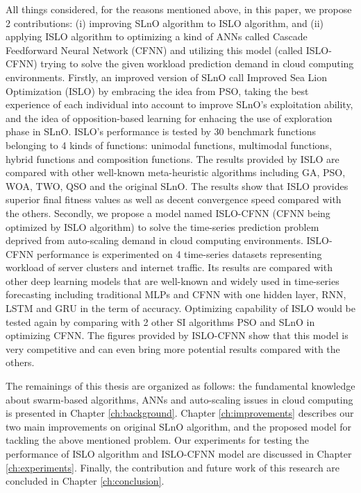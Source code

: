 \documentclass[../main.tex]{subfiles}
\begin{document}
	All things considered, for the reasons mentioned above, in this paper, we propose 2 contributions: (i) improving SLnO algorithm to ISLO algorithm, and (ii) applying ISLO algorithm to optimizing a kind of ANNs called Cascade Feedforward Neural Network (CFNN) and utilizing this model (called ISLO-CFNN) trying to solve the given workload prediction demand in cloud computing environments. Firstly, an improved version of SLnO call Improved Sea Lion Optimization (ISLO) by embracing the idea from PSO, taking the best experience of each individual into account to improve SLnO's exploitation ability, and the idea of opposition-based learning for enhacing the use of exploration phase in SLnO. ISLO's performance is tested by 30 benchmark functions belonging to 4 kinds of functions: unimodal functions, multimodal functions, hybrid functions and composition functions. The results provided by ISLO are compared with other well-known meta-heuristic algorithms including GA, PSO, WOA, TWO, QSO and the original SLnO. The results show that ISLO provides superior final fitness values as well as decent convergence speed compared with the others. Secondly, we propose a model named ISLO-CFNN (CFNN being optimized by ISLO algorithm) to solve the time-series prediction problem deprived from  auto-scaling demand in cloud computing environments. ISLO-CFNN performance is experimented on 4 time-series datasets representing workload of server clusters and internet traffic. Its results are compared with other deep learning models that are well-known and widely used in time-series forecasting including traditional MLPs and CFNN with one hidden layer, RNN, LSTM and GRU in the term of accuracy. Optimizing capability of ISLO would be tested again by comparing with 2 other SI algorithms PSO and SLnO in optimizing CFNN. The figures provided by ISLO-CFNN show that this model is very competitive and can even bring more potential results compared with the others.
	
	The remainings of this thesis are organized as follows: the fundamental knowledge about swarm-based algorithms, ANNs and auto-scaling issues in cloud computing is presented in Chapter \ref{ch:background}. Chapter \ref{ch:improvements} describes our two main improvements on original SLnO algorithm, and the proposed model for tackling the above mentioned problem. Our experiments for testing the performance of ISLO algorithm and ISLO-CFNN model are discussed in Chapter \ref{ch:experiments}. Finally, the contribution and future work of this research are concluded in Chapter \ref{ch:conclusion}. 
\end{document}
